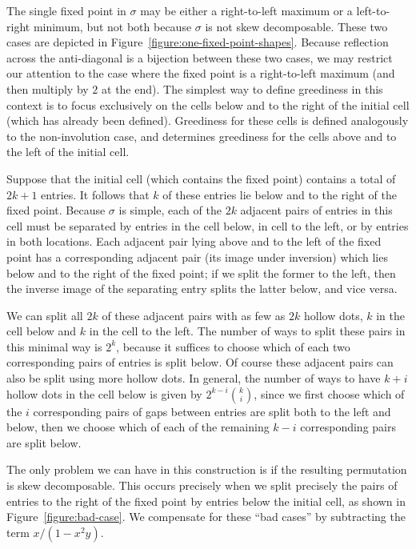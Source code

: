 \documentclass[10pt]{article}
\theoremstyle{plain}
\begin{document}
The single fixed point in $\sigma$ may be either a right-to-left maximum or a left-to-right minimum, but not both because $\sigma$ is not skew decomposable. These two cases are depicted in Figure~\ref{figure:one-fixed-point-shapes}. Because reflection across the anti-diagonal is a bijection between these two cases, we may restrict our attention to the case where the fixed point is a right-to-left maximum (and then multiply by $2$ at the end). The simplest way to define greediness in this context is to focus exclusively on the cells below and to the right of the initial cell (which has already been defined). Greediness for these cells is defined analogously to the non-involution case, and determines greediness for the cells above and to the left of the initial cell.

Suppose that the initial cell (which contains the fixed point) contains a total of $2k+1$ entries. It follows that $k$ of these entries lie below and to the right of the fixed point. Because $\sigma$ is simple, each of the $2k$ adjacent pairs of entries in this cell must be separated by entries in the cell below, in cell to the left, or by entries in both locations. Each adjacent pair lying above and to the left of the fixed point has a corresponding adjacent pair (its image under inversion) which lies below and to the right of the fixed point; if we split the former to the left, then the inverse image of the separating entry splits the latter below, and vice versa.

We can split all $2k$ of these adjacent pairs with as few as $2k$ hollow dots, $k$ in the cell below and $k$ in the cell to the left. The number of ways to split these pairs in this minimal way is $2^k$, because it suffices to choose which of each two corresponding pairs of entries is split below. Of course these adjacent pairs can also be split using more hollow dots. In general, the number of ways to have $k+i$ hollow dots in the cell below is given by $2^{k-i}{k \choose i}$, since we first choose which of the $i$ corresponding pairs of gaps between entries are split both to the left and below, then we choose which of each of the remaining $k-i$ corresponding pairs are split below.

The only problem we can have in this construction is if the resulting permutation is skew decomposable. This occurs precisely when we split precisely the pairs of entries to the right of the fixed point by entries below the initial cell, as shown in Figure~\ref{figure:bad-case}. We compensate for these ``bad cases'' by subtracting the term $x/(1 - x^2y)$.
\end{document}
